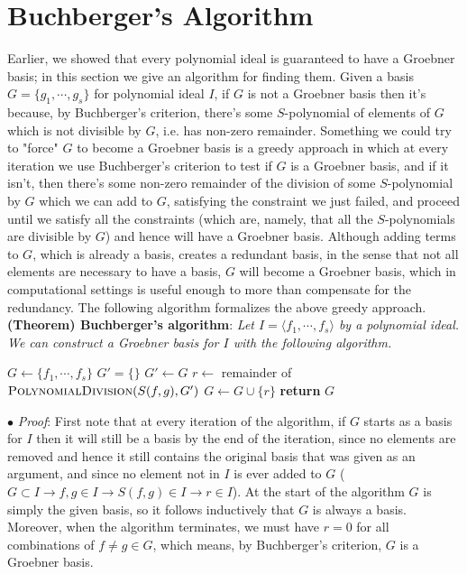 \documentclass{article}
\begin{document}
\section{Buchberger's Algorithm}
Earlier, we showed that every polynomial ideal is guaranteed to have a Groebner basis; in this section we give an algorithm for finding them. Given a basis $ G = \{ g_1, \cdots, g_s \} $ for polynomial ideal $ I $, if $ G $ is not a Groebner basis then it's because, by Buchberger's criterion, there's some $ S $-polynomial of elements of $ G $ which is not divisible by $ G $, i.e. has non-zero remainder. Something we could try to "force" $ G $ to become a Groebner basis is a greedy approach in which at every iteration we use Buchberger's criterion to test if $ G $ is a Groebner basis, and if it isn't, then there's some non-zero remainder of the division of some $ S $-polynomial by $ G $ which we can add to $ G $, satisfying the constraint we just failed, and proceed until we satisfy all the constraints (which are, namely, that all the $ S $-polynomials are divisible by $ G $) and hence will have a Groebner basis.
\newline
Although adding terms to $ G $, which is already a basis, creates a redundant basis, in the sense that not all elements are necessary to have a basis, $ G $ will become a Groebner basis, which in computational settings is useful enough to more than compensate for the redundancy. The following algorithm formalizes the above greedy approach.
\newline \newline
\textbf{(Theorem) Buchberger's algorithm}: \textit{Let $ I = \langle f_1, \cdots, f_s \rangle $ by a polynomial ideal. We can construct a Groebner basis for $ I $ with the following algorithm.}
\begin{algorithmic}
		\State $ G \gets \{ f_1, \cdots, f_s \} $
		\State $ G' = \{ \} $
			\State $ G' \gets G $
				\State $ r \gets $ remainder of $ \textproc{PolynomialDivision}(S(f, g), G') $
					\State $ G \gets G \cup \{ r \} $
				\EndIf
			\EndFor
		\EndWhile
		\State \textbf{return} $ G $
	\EndProcedure
\end{algorithmic}
\indent $ \bullet $ \textit{Proof}: First note that at every iteration of the algorithm, if $ G $ starts as a basis for $ I $ then it will still be a basis by the end of the iteration, since no elements are removed and hence it still contains the original basis that was given as an argument, and since no element not in $ I $ is ever added to $ G $ ($ G \subset I \rightarrow f, g \in I \rightarrow S(f, g) \in I \rightarrow r \in I $). At the start of the algorithm $ G $ is simply the given basis, so it follows inductively that $ G $ is always a basis. Moreover, when the algorithm terminates, we must have $ r = 0 $ for all combinations of $ f \neq g \in G $, which means, by Buchberger's criterion, $ G $ is a Groebner basis.
\end{document}
